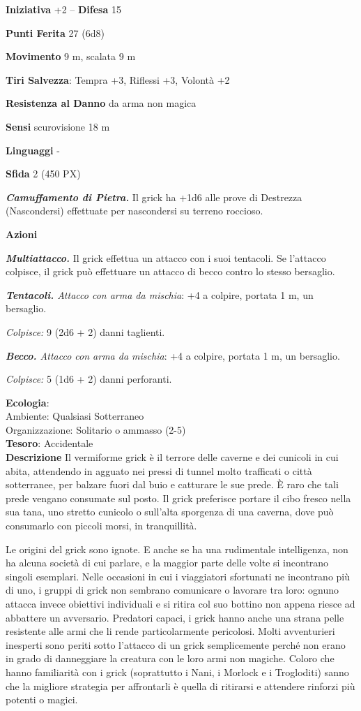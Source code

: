 \begin{multicols}{2}
	\textbf{Iniziativa} +2 -- \textbf{Difesa} 15

	\textbf{Punti Ferita} 27 (6d8)

	\textbf{Movimento} 9 m, scalata 9 m

	\textbf{Tiri Salvezza}: Tempra +3, Riflessi +3, Volontà +2

	\textbf{Resistenza al Danno} da arma non magica

	\textbf{Sensi} scurovisione 18 m

	\textbf{Linguaggi} -

	\textbf{Sfida} 2 (450 PX)

	\textit{\textbf{Camuffamento di Pietra.}} Il grick ha +1d6 alle prove di Destrezza (Nascondersi) effettuate per nascondersi su terreno roccioso.

	\textbf{Azioni}

	\textit{\textbf{Multiattacco.}} Il grick effettua un attacco con i suoi tentacoli. Se l'attacco colpisce, il grick può effettuare un attacco di becco contro lo stesso bersaglio.

	\textit{\textbf{Tentacoli.} Attacco con arma da mischia}: +4 a colpire, portata 1 m, un bersaglio.

	\textit{Colpisce:} 9 (2d6 + 2) danni taglienti.

	\textit{\textbf{Becco.} Attacco con arma da mischia}: +4 a colpire, portata 1 m, un bersaglio.

	\textit{Colpisce:} 5 (1d6 + 2) danni perforanti.

	\textbf{Ecologia}: \\
	Ambiente: Qualsiasi Sotterraneo\\
	Organizzazione: Solitario o ammasso (2-5)\\
	\textbf{Tesoro}: Accidentale\\

	\textbf{Descrizione}
	Il vermiforme grick è il terrore delle caverne e dei cunicoli in cui abita, attendendo in agguato nei pressi di tunnel molto trafficati o città sotterranee, per balzare fuori dal buio e catturare le sue prede. È raro che tali prede vengano consumate sul posto. Il grick preferisce portare il cibo fresco nella sua tana, uno stretto cunicolo o sull'alta sporgenza di una caverna, dove può consumarlo con piccoli morsi, in tranquillità.

	Le origini del grick sono ignote. E anche se ha una rudimentale intelligenza, non ha alcuna società di cui parlare, e la maggior parte delle volte si incontrano singoli esemplari. Nelle occasioni in cui i viaggiatori sfortunati ne incontrano più di uno, i gruppi di grick non sembrano comunicare o lavorare tra loro: ognuno attacca invece obiettivi individuali e si ritira col suo bottino non appena riesce ad abbattere un avversario. Predatori capaci, i grick hanno anche una strana pelle resistente alle armi che li rende particolarmente pericolosi. Molti avventurieri inesperti sono periti sotto l'attacco di un grick semplicemente perché non erano in grado di danneggiare la creatura con le loro armi non magiche. Coloro che hanno familiarità con i grick (soprattutto i Nani, i Morlock e i Trogloditi) sanno che la migliore strategia per affrontarli è quella di ritirarsi e attendere rinforzi più potenti o magici.


\end{multicols}
